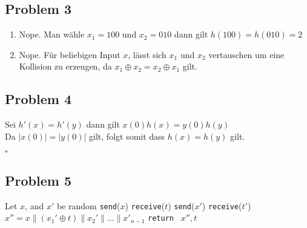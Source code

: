 \documentclass[12pt, german]{article}
\newcommand{\bewiesen}{\begin{flushright}$\square$ \end{flushright} }
\begin{document}
    \subsection*{Problem 3}
    \begin{enumerate}[label=\alph*)]
 \item Nope. Man wähle $x_1 = 100$ und $x_2 = 010$ dann gilt $h(100) = h(010) = 2$
  \item Nope. Für beliebigen Input $x$, lässt sich $x_1$ und $x_2$ vertauschen um eine Kollision zu erzeugen, da $x_1 \oplus x_2 = x_2 \oplus x_1$ gilt.
\end{enumerate}
    \subsection*{Problem 4}
    Sei $h'(x) = h'(y)$ dann gilt $x(0)h(x) = y(0)h(y)$ \\
    Da $|x(0)| = |y(0)|$ gilt, folgt somit dass $h(x) = h(y)$ gilt. 
 \bewiesen
 \newpage
    \subsection*{Problem 5}
    \begin{algorithm} 
    	\centering
    	\caption{ }
    	\label{Alg:1}
    	\begin{algorithmic}[1]
    		\State Let $x$, and $x'$ be random
    		\State \texttt{send}($x$)
    		\State \texttt{receive}($t$)
    		\State \texttt{send}($x'$)
    		\State \texttt{receive}($t'$)
    		\State $x'' = x \| (x_1' \oplus t)\|x_2'\|\ldots\|x'_{n-1}$
    		\State \texttt{return } $x'', t$
    	\end{algorithmic}
    \end{algorithm}

   	
    
\end{document}
